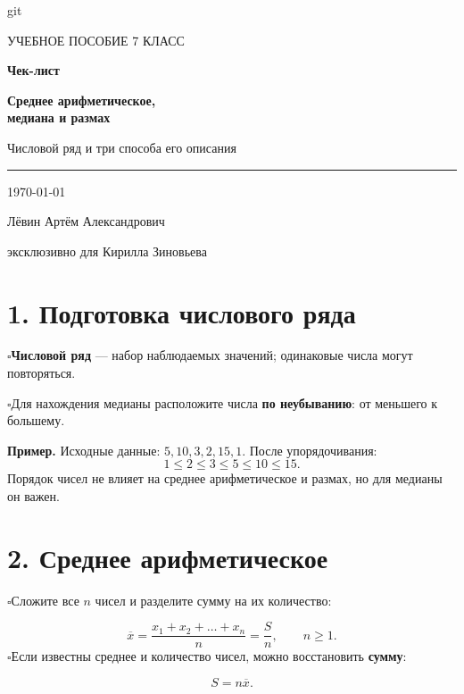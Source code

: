 git\documentclass[a4paper,12pt]{article}
\newcommand{\sectionline}{\par\vspace{-0.65em}\noindent{\color{accent!65}\rule{\linewidth}{0.45pt}}\par\vspace{0.25em}}
\newcommand{\knowledge}[1]{\noindent$\square$\enspace #1\par}
\begin{document}
\thispagestyle{empty}
\vspace*{37mm}
\begin{center}
{\color{darkaccent}\large УЧЕБНОЕ ПОСОБИЕ \textbullet{} 7 КЛАСС}\par
\vspace{18mm}
{\color{darkaccent}\fontsize{29}{35}\selectfont\bfseries Чек-лист}\par
\vspace{7mm}
{\fontsize{22}{28}\selectfont\bfseries Среднее арифметическое,\\[3mm] медиана и размах}\par
\vspace{12mm}
{\large Числовой ряд и три способа его описания}\par
\vspace{22mm}
{\color{accent}\rule{44mm}{0.7pt}}\par
\vspace{8mm}
{\large \today}\par
\vspace{18mm}
{\large Лёвин Артём Александрович}\par
{\large\color{darkaccent}эксклюзивно для Кирилла Зиновьева}\par
\end{center}
\vfill
\begin{center}
\end{center}
\clearpage

\section*{1. Подготовка числового ряда}
\sectionline
\knowledge{\textbf{Числовой ряд} --- набор наблюдаемых значений; одинаковые числа могут повторяться.}
\knowledge{Для нахождения медианы расположите числа \textbf{по неубыванию}: от меньшего к большему.}

\textbf{Пример.} Исходные данные: $5,10,3,2,15,1$. После упорядочивания:
\[
1\le 2\le 3\le 5\le 10\le 15.
\]
Порядок чисел не влияет на среднее арифметическое и размах, но для медианы он важен.

\section*{2. Среднее арифметическое}
\sectionline
\knowledge{Сложите все $n$ чисел и разделите сумму на их количество:}
\[
\boxed{\displaystyle \overline{x}=\frac{x_1+x_2+\ldots+x_n}{n}=\frac{S}{n}},
\qquad n\ge 1.
\]
\knowledge{Если известны среднее и количество чисел, можно восстановить \textbf{сумму}:}
\[
\boxed{S=n\overline{x}}.
\]
\end{document}
